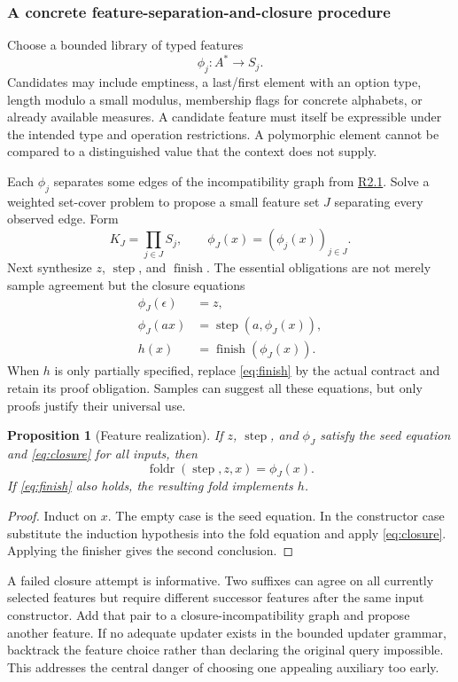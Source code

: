 \documentclass[11pt,a4paper]{article}
\newcommand{\qref}[1]{\hyperref[q:#1]{#1}}
\newcommand{\finish}{\operatorname{finish}}
\newcommand{\step}{\operatorname{step}}
\newcommand{\foldr}{\operatorname{foldr}}
\newtheorem{proposition}[theorem]{Proposition}
\theoremstyle{definition}
\theoremstyle{remark}
\begin{document}
\subsubsection*{A concrete feature-separation-and-closure procedure}

Choose a bounded library of typed features
\[
 \phi_j:A^*\to S_j.
\]
Candidates may include emptiness, a last/first element with an option type, length modulo a small modulus, membership flags for concrete alphabets, or already available measures. A candidate feature must itself be expressible under the intended type and operation restrictions. A polymorphic element cannot be compared to a distinguished value that the context does not supply.

Each $\phi_j$ separates some edges of the incompatibility graph from \qref{R2.1}. Solve a weighted set-cover problem to propose a small feature set $J$ separating every observed edge. Form
\[
 K_J=\prod_{j\in J}S_j,\qquad
 \phi_J(x)=(\phi_j(x))_{j\in J}.
\]
Next synthesize $z$, $\step$, and $\finish$. The essential obligations are not merely sample agreement but the closure equations
\begin{align}
 \phi_J(\epsilon)&=z,\\
 \phi_J(ax)&=\step(a,\phi_J(x)),\label{eq:closure}\\
 h(x)&=\finish(\phi_J(x)).\label{eq:finish}
\end{align}
When $h$ is only partially specified, replace \eqref{eq:finish} by the actual contract and retain its proof obligation. Samples can suggest all these equations, but only proofs justify their universal use.

\begin{proposition}[Feature realization]\label{prop:feature-realization}
If $z$, $\step$, and $\phi_J$ satisfy the seed equation and \eqref{eq:closure} for all inputs, then
\[
 \foldr(\step,z,x)=\phi_J(x).
\]
If \eqref{eq:finish} also holds, the resulting fold implements $h$.
\end{proposition}
\begin{proof}
Induct on $x$. The empty case is the seed equation. In the constructor case substitute the induction hypothesis into the fold equation and apply \eqref{eq:closure}. Applying the finisher gives the second conclusion.
\end{proof}

A failed closure attempt is informative. Two suffixes can agree on all currently selected features but require different successor features after the same input constructor. Add that pair to a closure-incompatibility graph and propose another feature. If no adequate updater exists in the bounded updater grammar, backtrack the feature choice rather than declaring the original query impossible. This addresses the central danger of choosing one appealing auxiliary too early.
\end{document}
